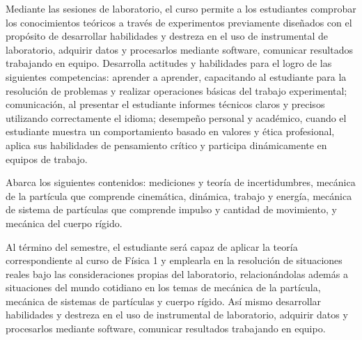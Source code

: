 \begin{syllabus}


\begin{justification}
Mediante las sesiones de laboratorio, el curso permite a los estudiantes comprobar los conocimientos teóricos a través de experimentos previamente diseñados con el propósito de desarrollar habilidades y destreza en el uso de instrumental de laboratorio, adquirir datos y procesarlos mediante software, comunicar resultados trabajando en equipo. Desarrolla actitudes y habilidades para el logro de las siguientes competencias: aprender a aprender, capacitando al estudiante para la resolución de problemas y realizar operaciones básicas del trabajo experimental; comunicación, al presentar el estudiante informes técnicos claros y precisos utilizando correctamente el idioma; desempeño personal y académico, cuando el estudiante muestra un comportamiento basado en valores y ética profesional, aplica sus habilidades de pensamiento crítico y participa dinámicamente en equipos de trabajo.

Abarca los siguientes contenidos: mediciones y teoría de incertidumbres, mecánica de la partícula que comprende cinemática, dinámica, trabajo y energía, mecánica de sistema de partículas que comprende impulso y cantidad de movimiento, y mecánica del cuerpo rígido.
\end{justification}

\begin{goals}
\item Al término del semestre, el estudiante será capaz de aplicar la teoría correspondiente al curso de Física 1 y emplearla en la resolución de situaciones reales bajo las consideraciones propias del laboratorio, relacionándolas además a situaciones del mundo cotidiano en los temas de mecánica de la partícula, mecánica de sistemas de partículas y cuerpo rígido. Así mismo desarrollar habilidades y destreza en el uso de instrumental de laboratorio, adquirir datos y procesarlos mediante software, comunicar resultados trabajando en equipo.
\end{goals}

\begin{outcomes}
\item {}
\item {}
\end{outcomes}

\begin{competences}
    \item {}
\end{competences}


\end{syllabus}
